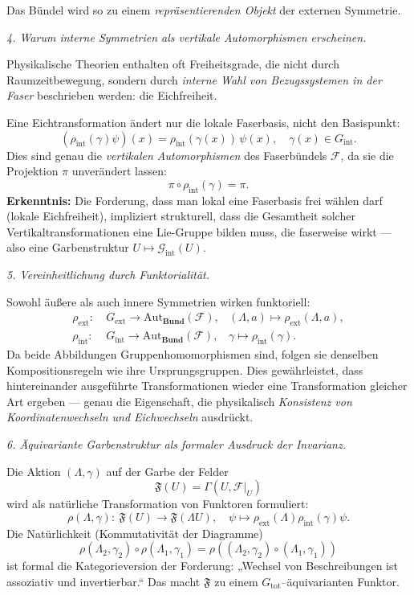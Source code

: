 \documentclass[10pt, letterpaper]{article}
\newcommand{\Aut}{\mathrm{Aut}}
\begin{document}
Das Bündel wird so zu einem \emph{repräsentierenden Objekt} der externen Symmetrie.

\bigskip
\emph{4. Warum interne Symmetrien als vertikale Automorphismen erscheinen.}

Physikalische Theorien enthalten oft Freiheitsgrade, die nicht durch Raumzeitbewegung,
sondern durch \emph{interne Wahl von Bezugssystemen in der Faser} beschrieben werden:
die Eichfreiheit.

Eine Eichtransformation ändert nur die lokale Faserbasis,
nicht den Basispunkt:
\[
(\rho_{\mathrm{int}}(\gamma)\psi)(x)
=\rho_{\mathrm{int}}(\gamma(x))\,\psi(x),
\quad \gamma(x)\in G_{\mathrm{int}}.
\]
Dies sind genau die \emph{vertikalen Automorphismen} des Faserbündels $\mathcal F$,
da sie die Projektion $\pi$ unverändert lassen:
\[
\pi\circ\rho_{\mathrm{int}}(\gamma)=\pi.
\]
\textbf{Erkenntnis:}
Die Forderung, dass man lokal eine Faserbasis frei wählen darf (lokale Eichfreiheit),
impliziert strukturell, dass die Gesamtheit solcher Vertikaltransformationen eine
Lie-Gruppe bilden muss, die faserweise wirkt — also eine
Garbenstruktur $U\mapsto\mathcal G_{\mathrm{int}}(U)$.

\bigskip
\emph{5. Vereinheitlichung durch Funktorialität.}

Sowohl äußere als auch innere Symmetrien wirken funktoriell:
\begin{align*}
\rho_{\mathrm{ext}}:&\ G_{\mathrm{ext}}\to \Aut_{\mathbf{Bund}}(\mathcal F),
&
(\Lambda,a)\mapsto\rho_{\mathrm{ext}}(\Lambda,a),\\[0.3em]
\rho_{\mathrm{int}}:&\ G_{\mathrm{int}}\to \Aut_{\mathbf{Bund}}(\mathcal F),
&
\gamma\mapsto\rho_{\mathrm{int}}(\gamma).
\end{align*}
Da beide Abbildungen Gruppenhomomorphismen sind, folgen sie denselben
Kompositionsregeln wie ihre Ursprungsgruppen.
Dies gewährleistet, dass hintereinander ausgeführte Transformationen
wieder eine Transformation gleicher Art ergeben — genau die Eigenschaft,
die physikalisch \emph{Konsistenz von Koordinatenwechseln und Eichwechseln}
ausdrückt.

\bigskip
\emph{6. Äquivariante Garbenstruktur als formaler Ausdruck der Invarianz.}

Die Aktion $(\Lambda,\gamma)$ auf der Garbe der Felder
\[
\mathfrak F(U)=\Gamma(U,\mathcal F|_U)
\]
wird als natürliche Transformation von Funktoren formuliert:
\[
\rho(\Lambda,\gamma):\ \mathfrak F(U)\longrightarrow\mathfrak F(\Lambda U),
\quad
\psi\mapsto\rho_{\mathrm{ext}}(\Lambda)\rho_{\mathrm{int}}(\gamma)\psi.
\]
Die Natürlichkeit (Kommutativität der Diagramme)
\[
\rho(\Lambda_2,\gamma_2)\circ\rho(\Lambda_1,\gamma_1)
=\rho((\Lambda_2,\gamma_2)\circ(\Lambda_1,\gamma_1))
\]
ist formal die Kategorieversion der Forderung:
„Wechsel von Beschreibungen ist assoziativ und invertierbar.“
Das macht $\mathfrak F$ zu einem $G_{\mathrm{tot}}$–äquivarianten Funktor.
\end{document}
